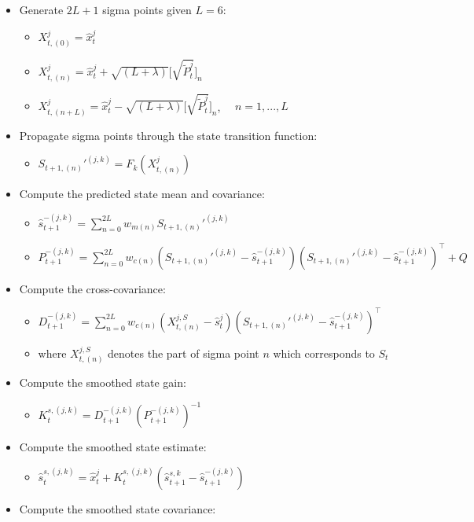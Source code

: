 \documentclass[12pt,letter,leqno]{article}
\theoremstyle{asn}
\theoremstyle{lem}
\theoremstyle{slem}
\theoremstyle{prop}
\theoremstyle{appprop}
\theoremstyle{rem}
\theoremstyle{defn}
\begin{document}
\begin{itemize}
\begin{itemize}
\item Generate $2L+1$ sigma points given $L=6$:
\begin{itemize}
\item $X_{t,(0)}^j =\hat{x}_{t}^j$
\item $X_{t,(n)}^j =\hat{x}_{t}^j + \sqrt{(L+\lambda)}\big[\sqrt{\tilde{P}_{t}^j}\big]_n$
\item $X_{t,(n+L)}^j =\hat{x}_{t}^j - \sqrt{(L+\lambda)}\big[\sqrt{\tilde{P}_{t}^j}\big]_n$, $\quad  n=1,...,L$
\end{itemize}


\item Propagate sigma points through the state transition function:
\begin{itemize}
\item \( S_{t+1,(n)}'^{(j,k)} = F_k(X_{t,(n)}^j) \)
\end{itemize}
\item Compute the predicted state mean and covariance:
\begin{itemize}
\item $\hat{s}_{t+1}^{-(j,k)} = \sum_{n=0}^{2L} w_{m(n)}  S_{t+1,(n)}'^{(j,k)}$
\item $P_{t+1}^{-(j,k)} = \sum_{n=0}^{2L} w_{c(n)} (S_{t+1,(n)}'^{(j,k)} - \hat{s}_{t+1}^{-(j,k)})(S_{t+1,(n)}'^{(j,k)} - \hat{s}_{t+1}^{-(j,k)})^\top + Q$
\end{itemize}
\item Compute the cross-covariance:
\begin{itemize}
\item $D_{t+1}^{-(j,k)} = \sum_{n=0}^{2L} w_{c(n)} (X_{t,(n)}^{j,S} - \hat{s}_t^j)(S_{t+1,(n)}'^{(j,k)} - \hat{s}_{t+1}^{-(j,k)})^\top$
\item where $X_{t,(n)}^{j,S}$ denotes the part of sigma point $n$ which corresponds to $S_t$
\end{itemize}
\item Compute the smoothed state gain:
\begin{itemize}
\item \( K_t^{s,(j,k)} = D_{t+1}^{-(j,k)} (P_{t+1}^{-(j,k)})^{-1} \)
\end{itemize}
\item Compute the smoothed state estimate:
\begin{itemize}
\item \( \hat{s}_t^{s,(j,k)} = \hat{x}_t^j + K_t^{s,(j,k)}(\hat{s}_{t+1}^{s,k} - \hat{s}_{t+1}^{-(j,k)}) \)
\end{itemize}
\item Compute the smoothed state covariance:

\end{itemize}
\end{itemize}
\end{document}
